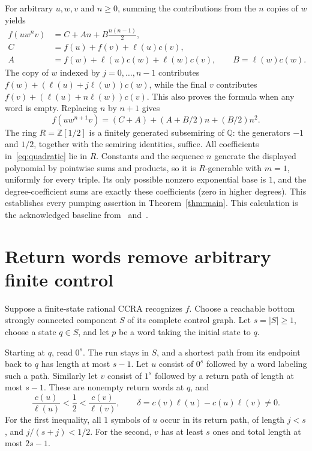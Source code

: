 \documentclass[acmlarge,screen,11pt,nonacm]{acmart}
\newcommand{\Q}{\mathbb{Q}}
\newcommand{\Z}{\mathbb{Z}}
\theoremstyle{definition}
\begin{document}
For arbitrary $u,w,v$ and $n\geq0$, summing the contributions from the $n$ copies of $w$ yields
\begin{align*}
 f(uw^n v)&=C+An+B\frac{n(n-1)}2,\\
 C&=f(u)+f(v)+\ell(u)c(v),\\
 A&=f(w)+\ell(u)c(w)+\ell(w)c(v),\qquad B=\ell(w)c(w).
\end{align*}
The copy of $w$ indexed by $j=0,\ldots,n-1$ contributes $f(w)+(\ell(u)+j\ell(w))c(w)$, while the final $v$ contributes $f(v)+(\ell(u)+n\ell(w))c(v)$. This also proves the formula when any word is empty. Replacing $n$ by $n+1$ gives
\begin{equation}\label{eq:quadratic}
 f(uw^{n+1}v)=(C+A)+(A+B/2)n+(B/2)n^2.
\end{equation}
The ring $R=\Z[1/2]$ is a finitely generated subsemiring of $\Q$: the generators $-1$ and $1/2$, together with the semiring identities, suffice. All coefficients in~\eqref{eq:quadratic} lie in $R$. Constants and the sequence $n$ generate the displayed polynomial by pointwise sums and products, so it is $R$-generable with $m=1$, uniformly for every triple. Its only possible nonzero exponential base is $1$, and the degree-coefficient sums are exactly these coefficients (zero in higher degrees). This establishes every pumping assertion in Theorem~\ref{thm:main}. This calculation is the acknowledged baseline from~\cite[Example~26]{MPS26} and~\cite[Appendix~B.4]{MPSfull}.

\section{Return words remove arbitrary finite control}\label{sec:control}
Suppose a finite-state rational CCRA recognizes $f$. Choose a reachable bottom strongly connected component $S$ of its complete control graph. Let $s=|S|\geq1$, choose a state $q\in S$, and let $p$ be a word taking the initial state to $q$.

Starting at $q$, read $0^s$. The run stays in $S$, and a shortest path from its endpoint back to $q$ has length at most $s-1$. Let $u$ consist of $0^s$ followed by a word labeling such a path. Similarly let $v$ consist of $1^s$ followed by a return path of length at most $s-1$. These are nonempty return words at $q$, and
\begin{equation}\label{eq:density}
 \frac{c(u)}{\ell(u)}<\frac12<\frac{c(v)}{\ell(v)},\qquad
 \delta=c(v)\ell(u)-c(u)\ell(v)\ne0.
\end{equation}
For the first inequality, all $1$ symbols of $u$ occur in its return path, of length $j<s$, and $j/(s+j)<1/2$. For the second, $v$ has at least $s$ ones and total length at most $2s-1$.
\end{document}
